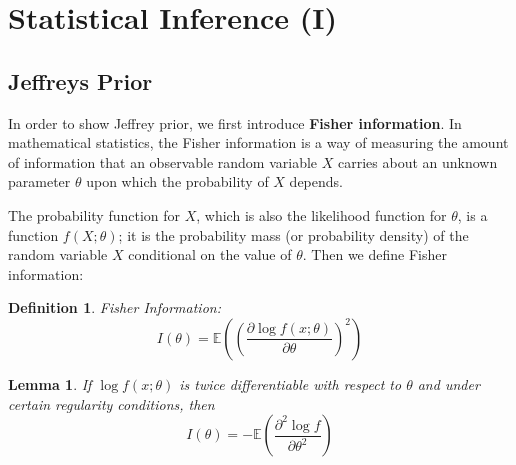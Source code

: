\documentclass[11pt]{article}
\def\BE{{\mathbb E}}
\newtheorem{lemma}{Lemma}[section]
\newtheorem{definition}{Definition}[section]
\begin{document}
\section{Statistical Inference (I)}

\subsection{Jeffreys Prior}
In order to show Jeffrey prior, we first introduce \textbf{Fisher information}. In mathematical statistics, the Fisher information is a way of measuring the amount of information that an observable random variable $X$ carries about an unknown parameter $\theta$ upon which the probability of $X$ depends.

The probability function for $X$, which is also the likelihood function for $\theta$, is a function $f(X; \theta)$; it is the probability mass (or probability density) of the random variable $X$ conditional on the value of $\theta$. Then we define Fisher information:
\begin{definition}
Fisher Information:
$$I(\theta)=\BE((\frac{\partial\log f(x; \theta)}{\partial\theta})^2)$$
\end{definition}

\begin{lemma}
If $\log f(x; \theta)$ is twice differentiable with respect to $\theta$ and under certain regularity conditions, then
$$I(\theta) = -\BE(\frac{\partial^2\log f}{\partial\theta ^ 2})$$
\end{lemma}
\end{document}
